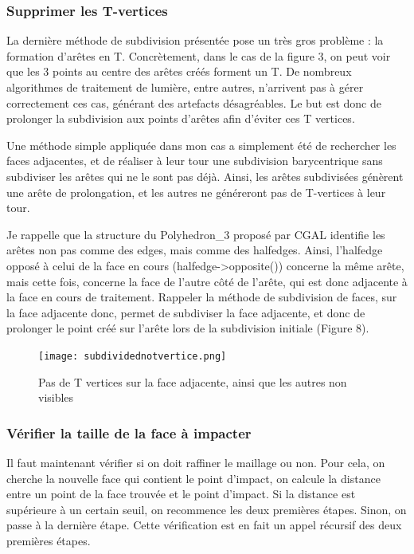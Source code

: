 \documentclass[a4paper,french]{report}
\begin{document}
				\subsubsection{Supprimer les T-vertices}
					La dernière méthode de subdivision présentée pose un très gros problème : la formation d'arêtes en T. Concrètement, dans le cas de la figure 3, on peut voir que les 3 points au centre des arêtes créés forment un T. De nombreux algorithmes de traitement de lumière, entre autres, n'arrivent pas à gérer correctement ces cas, générant des artefacts désagréables. Le but est donc de prolonger la subdivision aux points d'arêtes afin d'éviter ces T vertices. \par 
					Une méthode simple appliquée dans mon cas a simplement été de rechercher les faces adjacentes, et de réaliser à leur tour une subdivision barycentrique sans subdiviser les arêtes qui ne le sont pas déjà. Ainsi, les arêtes subdivisées génèrent une arête de prolongation, et les autres ne généreront pas de T-vertices à leur tour. \par 
					Je rappelle que la structure du Polyhedron\_3 proposé par CGAL identifie les arêtes non pas comme des edges, mais comme des halfedges. Ainsi, l'halfedge opposé à celui de la face en cours (halfedge-\textgreater opposite()) concerne la même arête, mais cette fois, concerne la face de l'autre côté de l'arête, qui est donc adjacente à la face en cours de traitement. Rappeler la méthode de subdivision de faces, sur la face adjacente donc, permet de subdiviser la face adjacente, et donc de prolonger le point créé sur l'arête lors de la subdivision initiale (Figure 8).
					\begin{figure}[h]
						\centering
						\texttt{[image: subdividednotvertice.png]}
						\caption{Pas de T vertices sur la face adjacente, ainsi que les autres non visibles}
					\end{figure}
				\subsubsection{Vérifier la taille de la face à impacter}
					Il faut maintenant vérifier si on doit raffiner le maillage ou non. Pour cela, on cherche la nouvelle face qui contient le point d'impact, on calcule la distance entre un point de la face trouvée et le point d'impact. Si la distance est supérieure à un certain seuil, on recommence les deux premières étapes. Sinon, on passe à la dernière étape. Cette vérification est en fait un appel récursif des deux premières étapes.
\end{document}
